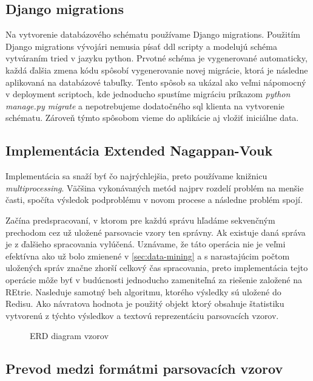 \subsection{Django migrations}
Na vytvorenie databázového schématu používame Django migrations. Použitím Django migrations vývojári nemusia písať ddl scripty a modelujú schéma vytváraním tried v jazyku python. Prvotné schéma je vygenerované automaticky, každá ďalšia zmena kódu spôsobí vygenerovanie novej migrácie, ktorá je následne aplikovaná na databázové tabuľky. Tento spôsob sa ukázal ako veľmi nápomocný v deployment scriptoch, kde jednoducho spustíme migráciu príkazom \emph{python manage.py migrate} a nepotrebujeme dodatočného sql klienta na vytvorenie schématu. Zároveň týmto spôsobom vieme do aplikácie aj vložiť iniciálne data.

\subsection{Implementácia Extended Nagappan-Vouk}
Implementácia sa snaží byť čo najrýchlejšia, preto používame knižnicu \emph{multiprocessing}. Väčšina vykonávaných metód najprv rozdelí problém na menšie časti, spočíta výsledok podproblému v novom procese a následne problém spojí. 
\par  Začína predspracovaní, v ktorom pre každú správu hľadáme sekvenčným prechodom cez už uložené parsovacie vzory ten správny. Ak existuje daná správa je z ďalšieho spracovania vylúčená. Uznávame, že táto operácia nie je veľmi efektívna ako už bolo zmienené v \ref{sec:data-mining} a s narastajúcim počtom uložených správ značne zhorší celkový čas spracovania, preto implementácia tejto operácie môže byť v budúcnosti  jednoducho zameniteľná za riešenie založené na REtrie. Nasleduje samotný beh algoritmu, ktorého výsledky sú uložené do Redisu. Ako návratova hodnota je použitý objekt ktorý obsahuje štatistiku vytvorenú z týchto výsledkov a textovú reprezentáciu parsovacích vzorov.

\begin{figure}[htbp]
 \centering 
 \begin{minipage}{0.95\linewidth}
 	\centering
 \end{minipage}
  \caption{ERD diagram vzorov}
  \label{fig:erd-patterns}
\end{figure}

\subsection{Prevod medzi formátmi parsovacích vzorov}
\label{sec:format-transformation}


